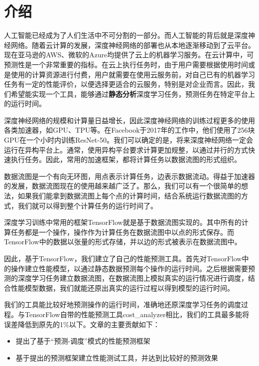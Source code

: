 \chapter{介绍}
\label{cha:intro}

    人工智能已经成为了人们生活中不可分割的一部分。而人工智能的背后就是深度神经网络。随着云计算的发展，深度神经网络的部署也从本地逐渐移动到了云平台。现在亚马逊的AWS、微软的Azure均提供了云上的机器学习服务。在云计算中，可预测性是一个非常重要的指标。\cite{cloud, serverless}在云上执行任务时，由于用户需要根据使用时间或是使用的计算资源进行付费，用户就需要在使用云服务前，对自己已有的机器学习任务有一定的性能评价，以便选择更适合的云服务，特别是对企业而言。因此，我们希望能实现一个工具，能够通过{\bfseries 静态分析}深度学习任务，预测任务在特定平台上的运行时间。

    深度神经网络的规模和计算量日益增长，因此深度神经网络的训练过程更多的使用各类加速器，如GPU、TPU等。在Facebook于2017年的工作中，他们使用了256块GPU在一个小时内训练ResNet-50。\cite{fb_imagenet}我们可以确定的是，将来深度神经网络一定会运行在异构平台上。通常，使用异构平台要求计算更加规整，以通过并行的方式快速执行任务。因此，常用的加速框架，都将计算任务以数据流图的形式组织。
    
    数据流图是一个有向无环图，用点表示计算任务，边表示数据流动。\cite{dataflow}得益于加速器的发展，数据流图现在的使用越来越广泛了。那么，我们可以有一个很简单的想法，如果我们能拿到数据流图上每个点的计算时间，结合系统运行数据流图的方式，我们就可以得到整个计算任务的运行时间了。
    
    深度学习训练中常用的框架TensorFlow\cite{tensorflow}就是基于数据流图实现的。其中所有的计算任务都是一个操作，操作作为计算任务在数据流图中以点的形式保存。而TensorFlow中的数据以张量的形式存储，并以边的形式被表示在数据流图中。
    
    因此，基于TensorFlow，我们建立了自己的性能预测工具。首先对TensorFlow中的操作建立性能模型，以通过静态数据预测每个操作的运行时间。之后根据需要预测的深度学习任务建立数据流图，在数据流图上模拟真实的运行情况进行调度，结合性能模型数据，我们就能还原出真实的运行过程以得到模型的运行时间。
    
    我们的工具能比较好地预测操作的运行时间，准确地还原深度学习任务的调度过程。与TensorFlow自带的性能预测工具cost\_analyzer相比，我们的工具最多能将误差降低到原先的1\%以下。文章的主要贡献如下：
    
    \begin{itemize}
        \item 提出了基于“预测-调度”模式的性能预测框架
        \item 基于提出的预测框架建立性能测试工具，并达到比较好的预测效果
    \end{itemize}
